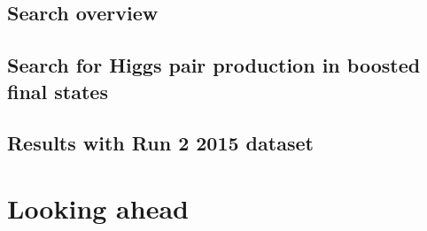\documentclass{Dissertate}
\begin{document}
\chapter{Search overview}

\chapter{Search for Higgs pair production in boosted final states}


\chapter{Results with Run 2 2015 dataset}

\part{Looking ahead}

%    


\clearpage




\end{document}
